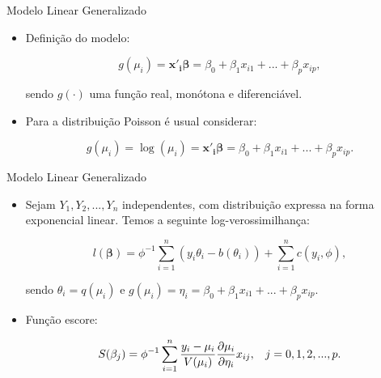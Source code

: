 \documentclass[10pt, aspectratio=169]{beamer}
\begin{document}


\begin{frame}{Modelo Linear Generalizado} 

\begin{itemize}


 \item Definição do modelo:

  \vspace{0,5cm}  
  
$$
   g(\mu_{i})=\boldsymbol{x'_{i}\beta}=\beta_{0}+\beta_{1}x_{i1}+...+\beta_{p}x_{ip},
$$

  \vspace{0,5cm}  
  
sendo $g(\cdot)$ uma função real, monótona e diferenciável.

  \vspace{0,5cm}  
  
\item Para a distribuição Poisson é usual considerar:

$$
   g(\mu_{i})= \log(\mu_i) = \boldsymbol{x'_{i}\beta}=\beta_{0}+\beta_{1}x_{i1}+...+\beta_{p}x_{ip}.
$$

\end{itemize}

\end{frame}




\begin{frame}{Modelo Linear Generalizado} 

\begin{itemize}


\item Sejam $Y_{1},Y_{2},...,Y_{n}$ independentes, com distribuição expressa na forma exponencial linear. Temos a seguinte log-verossimilhança:

$$
    l(\boldsymbol{\beta })=\phi^{-1}\sum_{i=1}^{n}(y_{i}\theta_{i}-b(\theta_{i}))+\sum_{i=1}^{n}c(y_{i},\phi),
$$

sendo $\theta_i=q(\mu_i) \text{ e } g(\mu_i)=\eta_i=\beta_{0}+\beta_{1}x_{i1}+...+\beta_{p}x_{ip}.$


\item Função escore:

$$
   S(\beta_j)=\phi^{-1}\sum_{i=1}^{n}\frac{y_{i}-\mu_{i}}{V(\mu_{i})} \frac{\partial \mu_{i}}{\partial \eta_{i}}x_{ij}, \hspace{0,3cm} j=0,1,2,...,p.
$$




\end{itemize}

\end{frame}
\end{document}
